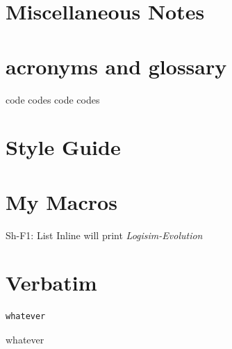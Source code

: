 \section{Miscellaneous Notes}

\section{acronyms and glossary}

\gls{code} %
\glspl{code} %
\Gls{code} %
\Glspl{code} %


\section{Style Guide}


\section{My Macros}
Sh-F1: List Inline
\Le will print \textit{Logisim-Evolution}

\section{Verbatim}
\begin{Verbatim}[commandchars=~\[\], samepage=true]
whatever
\end{Verbatim}

\begin{binDisp} %
whatever
\end{binDisp}

